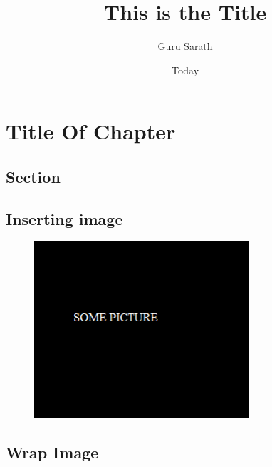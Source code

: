 \documentclass[a4paper,12pt]{book}
\begin{document}
\title{\Large{\textbf{This is the Title}}}
\author{Guru Sarath}
\date{Today}
\maketitle

\let\cleardoublepage\clearpage

\chapter{Title Of Chapter}
\blindmathtrue
\blindtext[7]
\enlargethispage{\baselineskip}
\section{Section}
\blinditemize
\blindenumerate

\pagebreak
\section{Inserting image}
\blindtext
\begin{figure}[ht]
\centering
\includegraphics[width=8cm]{pic1.png}
\end{figure}
\blindtext


\newpage
\section*{Wrap Image}
\begingroup
\setlength{\intextsep}{0pt}
\setlength{\columnsep}{15pt}
\end{document}
